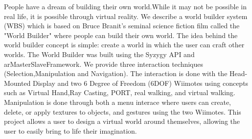 People have a dream of building their own world.While it may not be possible in real life, it is possible through virtual reality.
We describe a world builder system (WBS) which is based on Bruce Branit's seminal science fiction film called the "World Builder" where people can build their own world.
The idea behind the world builder concept is simple: create a world in which the user can craft other worlds.
The World Builder was built using the Syzygy API and arMasterSlaveFramework.
We provide three interaction techniques (Selection,Manipulation and Navigation).
The interaction is done with the Head-Mounted Display and two 6 Degree of Freedom (6DOF) Wiimotes using concepts such as Virtual Hand,Ray Casting, PORT, real walking, and virtual walking.
Manipulation is done through both a menu interace where users can create, delete, or apply textures to objects, and gestures using the two Wiimotes.
This project allows a user to design a virtual world around themselves, allowing the user to easily bring to life their imagination.
